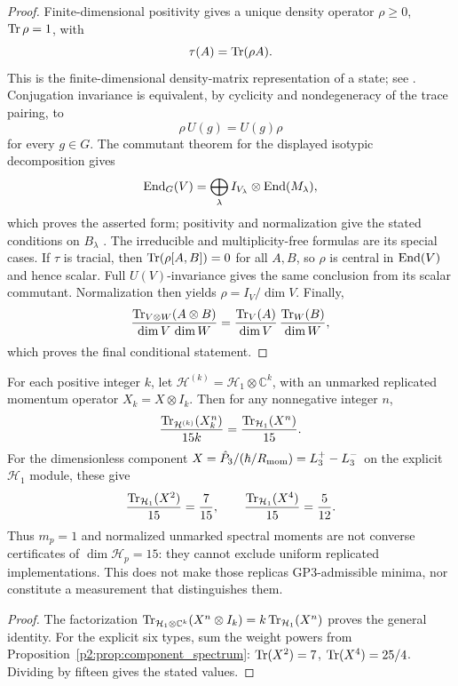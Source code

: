 \documentclass[12pt,a4paper]{article}
\begin{document}
\begin{proof}
Finite-dimensional positivity gives a unique density operator
\(\rho\ge0\), \(\operatorname{Tr}\rho=1\), with
\[
\tau(A)=\operatorname{Tr}(\rho A).
\]
This is the finite-dimensional density-matrix representation of a state;
see \cite{BratteliRobinson1987,HornJohnson2013}.
Conjugation invariance is equivalent, by cyclicity and nondegeneracy of the
trace pairing, to
\[
\rho\,U(g)=U(g)\rho
\]
for every \(g\in G\).  The commutant theorem for the displayed isotypic
decomposition gives
\[
\operatorname{End}_G(V)
=
\bigoplus_\lambda
I_{V_\lambda}\otimes\operatorname{End}(M_\lambda),
\]
which proves the asserted form; positivity and normalization give the stated
conditions on \(B_\lambda\)
\cite{fulton1991representation,Hall2015lie}.  The irreducible and
multiplicity-free formulas are its special cases.  If \(\tau\) is tracial, then
\(\operatorname{Tr}(\rho[A,B])=0\) for all \(A,B\), so \(\rho\) is central in
\(\operatorname{End}(V)\) and hence scalar.  Full \(U(V)\)-invariance gives the same
conclusion from its scalar commutant.  Normalization then yields
\(\rho=I_V/\dim V\).  Finally,
\[
\frac{\operatorname{Tr}_{V\otimes W}(A\otimes B)}{\dim V\,\dim W}
=
\frac{\operatorname{Tr}_V(A)}{\dim V}\,
\frac{\operatorname{Tr}_W(B)}{\dim W},
\]
which proves the final conditional statement.
\end{proof}


\begin{proposition}
\label{p2b:prop:normalized-multiplicity-indistinguishability}
For each positive integer \(k\), let
\(\mathcal H^{(k)}=\mathcal H_1\otimes\mathbb C^k\), with an unmarked
replicated momentum operator \(X_k=X\otimes I_k\).  Then for any
nonnegative integer \(n\),
\[
 \frac{\operatorname{Tr}_{\mathcal H^{(k)}}(X_k^n)}{15k}
 =\frac{\operatorname{Tr}_{\mathcal H_1}(X^n)}{15}.
\]
For the dimensionless component
\(X=\hat P_3/(\hbar/R_{\mathrm{mom}})=L_3^+-L_3^-\) on the explicit
\(\mathcal H_1\) module, these give
\[
 \frac{\operatorname{Tr}_{\mathcal H_1}(X^2)}{15}=\frac7{15},\qquad
 \frac{\operatorname{Tr}_{\mathcal H_1}(X^4)}{15}=\frac5{12}.
\]
Thus \(m_p=1\) and normalized unmarked spectral moments are not
converse certificates of \(\dim\mathcal H_p=15\): they cannot exclude
uniform replicated implementations.  This does not make those replicas
GP3-admissible minima, nor constitute a measurement that distinguishes them.
\end{proposition}
\begin{proof}
The factorization
\(\operatorname{Tr}_{\mathcal H_1\otimes\mathbb C^k}(X^n\otimes I_k)
=k\operatorname{Tr}_{\mathcal H_1}(X^n)\)
proves the general identity.  For the explicit six types, sum the
weight powers from Proposition~\ref{p2:prop:component_spectrum}:
\(\operatorname{Tr}(X^2)=7\), \(\operatorname{Tr}(X^4)=25/4\).  Dividing by fifteen
gives the stated values.
\end{proof}
\end{document}
